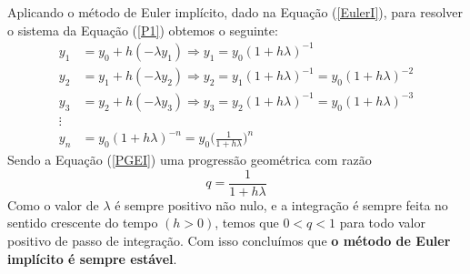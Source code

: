\documentclass[12pt]{peqdoc}
\begin{document}
	Aplicando o método de Euler implícito, dado na Equação (\ref{EulerI}), para resolver o sistema da Equação (\ref{P1}) obtemos o seguinte:
	\begin{align}
	y_1 &= y_0 + h(-\lambda y_1) \Rightarrow y_1 = y_0(1+h\lambda)^{-1}\nonumber\\
	y_2 &= y_1 + h(-\lambda y_2) \Rightarrow y_2 = y_1(1+h\lambda)^{-1} = y_0(1+h\lambda)^{-2}\nonumber\\
	y_3 &= y_2 + h(-\lambda y_3) \Rightarrow y_3 = y_2(1+h\lambda)^{-1} = y_0(1+h\lambda)^{-3}\nonumber\\
	\vdots\nonumber\\
	y_n &= y_0(1+h\lambda)^{-n}=y_0\bigg(\frac{1}{1+h\lambda}\bigg)^n\label{PGEI}
	\end{align}
	\noindent Sendo a Equação (\ref{PGEI}) uma progressão geométrica com razão 
	\begin{equation}
	q = \frac{1}{1+h\lambda}
	\end{equation}
	\noindent Como o valor de $ \lambda $ é sempre positivo não nulo, e a integração é sempre feita no sentido crescente do tempo $ (h>0) $, temos que $ 0<q<1 $ para todo valor positivo de passo de integração. Com isso concluímos que \textbf{o método de Euler implícito é sempre estável}.
	
	
\end{document}
